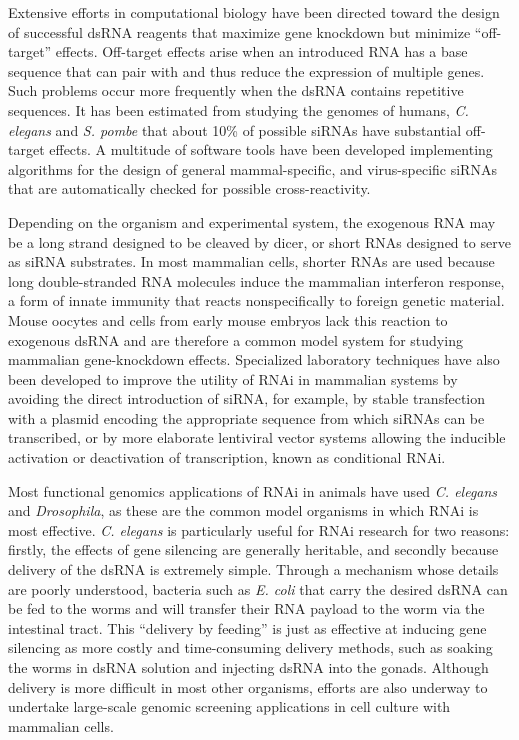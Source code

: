 Extensive efforts in computational biology have been directed toward the design of successful dsRNA reagents that maximize gene knockdown but minimize ``off-target'' effects. Off-target effects arise when an introduced RNA has a base sequence that can pair with and thus reduce the expression of multiple genes. Such problems occur more frequently when the dsRNA contains repetitive sequences. It has been estimated from studying the genomes of humans, \emph{C. elegans} and \emph{S. pombe} that about 10\% of possible siRNAs have substantial off-target effects. A multitude of software tools have been developed implementing algorithms for the design of general mammal-specific, and virus-specific siRNAs that are automatically checked for possible cross-reactivity.

Depending on the organism and experimental system, the exogenous RNA may be a long strand designed to be cleaved by dicer, or short RNAs designed to serve as siRNA substrates. In most mammalian cells, shorter RNAs are used because long double-stranded RNA molecules induce the mammalian interferon response, a form of innate immunity that reacts nonspecifically to foreign genetic material. Mouse oocytes and cells from early mouse embryos lack this reaction to exogenous dsRNA and are therefore a common model system for studying mammalian gene-knockdown effects. Specialized laboratory techniques have also been developed to improve the utility of RNAi in mammalian systems by avoiding the direct introduction of siRNA, for example, by stable transfection with a plasmid encoding the appropriate sequence from which siRNAs can be transcribed, or by more elaborate lentiviral vector systems allowing the inducible activation or deactivation of transcription, known as conditional RNAi.

Most functional genomics applications of RNAi in animals have used \emph{C. elegans} and \emph{Drosophila}, as these are the common model organisms in which RNAi is most effective. \emph{C. elegans} is particularly useful for RNAi research for two reasons: firstly, the effects of gene silencing are generally heritable, and secondly because delivery of the dsRNA is extremely simple. Through a mechanism whose details are poorly understood, bacteria such as \emph{E. coli} that carry the desired dsRNA can be fed to the worms and will transfer their RNA payload to the worm via the intestinal tract. This ``delivery by feeding'' is just as effective at inducing gene silencing as more costly and time-consuming delivery methods, such as soaking the worms in dsRNA solution and injecting dsRNA into the gonads. Although delivery is more difficult in most other organisms, efforts are also underway to undertake large-scale genomic screening applications in cell culture with mammalian cells.

